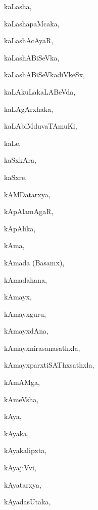 \begin{multicols}{3}
{\noindent
{kaLasha}, \pageref{kaLasha}

\noindent
{kaLashapaMcaka}, \pageref{kaLashapaMcaka}

\noindent
{kaLashAcAyaR}, \pageref{kaLashAcAyaR}

\noindent
{kaLashABiSeVka}, \pageref{kaLashABiSeVka}

\noindent
{kaLashABiSeVkadiVkeSx}, \pageref{kaLashABiSeVkadiVkeSx}

\noindent
{kaLAkuLakaLABeVda}, \pageref{kaLAkuLakaLABeVda}

\noindent
{kaLAgArxhaka}, \pageref{kaLAgArxhaka}

\noindent
{kaLAbiMduvaTAmuKi}, \pageref{kaLAbiMduvaTAmuKi}

\noindent
{kaLe}, \pageref{kaLe}

\noindent
{kaSxkAra}, \pageref{kaSxkAra}

\noindent
{kaSxre}, \pageref{kaSxre}

\noindent
{kAMDatarxya}, \pageref{kAMDatarxya}

\noindent
{kApAlamAgaR}, \pageref{kApAlamAgaR}

\noindent
{kApAlika}, \pageref{kApAlika}

\noindent
{kAma}, \pageref{kAma}

\noindent
{kAmada (Basamx)}, \pageref{kAmada (Basamx)}

\noindent
{kAmadahana}, \pageref{kAmadahana}

\noindent
{kAmayx}, \pageref{kAmayx}

\noindent
{kAmayxguru}, \pageref{kAmayxguru}

\noindent
{kAmayxdAna}, \pageref{kAmayxdAna}

\noindent
{kAmayxnirasanasathxla}, \pageref{kAmayxnirasanasathxla}

\noindent
{kAmayxparxtiSAThxsathxla}, \pageref{kAmayxparxtiSAThxsathxla}

\noindent
{kAmAMga}, \pageref{kAmAMga}

\noindent
{kAmeVsha}, \pageref{kAmeVsha}

\noindent
{kAya}, \pageref{kAya}

\noindent
{kAyaka}, \pageref{kAyaka}

\noindent
{kAyakalipxta}, \pageref{kAyakalipxta}

\noindent
{kAyajiVvi}, \pageref{kAyajiVvi}

\noindent
{kAyatarxya}, \pageref{kAyatarxya}

\noindent
{kAyadasUtaka}, \pageref{kAyadasUtaka}

}
\end{multicols}
